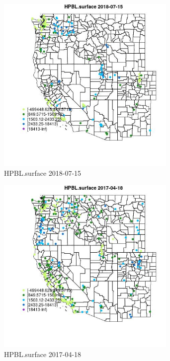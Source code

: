 \begin{figure} 
\centering  
\includegraphics[width=0.77\textwidth]{Code_Outputs/Report_ML_input_PM25_Step4_part_e_de_duplicated_aves_compiled_2019-05-21wNAs_MapObsHPBLsurface2018-07-15.jpg} 
\caption{\label{fig:Report_ML_input_PM25_Step4_part_e_de_duplicated_aves_compiled_2019-05-21wNAsMapObsHPBLsurface2018-07-15}HPBL.surface 2018-07-15} 
\end{figure} 
 

\clearpage 

\begin{figure} 
\centering  
\includegraphics[width=0.77\textwidth]{Code_Outputs/Report_ML_input_PM25_Step4_part_e_de_duplicated_aves_compiled_2019-05-21wNAs_MapObsHPBLsurface2017-04-18.jpg} 
\caption{\label{fig:Report_ML_input_PM25_Step4_part_e_de_duplicated_aves_compiled_2019-05-21wNAsMapObsHPBLsurface2017-04-18}HPBL.surface 2017-04-18} 
\end{figure} 
 

